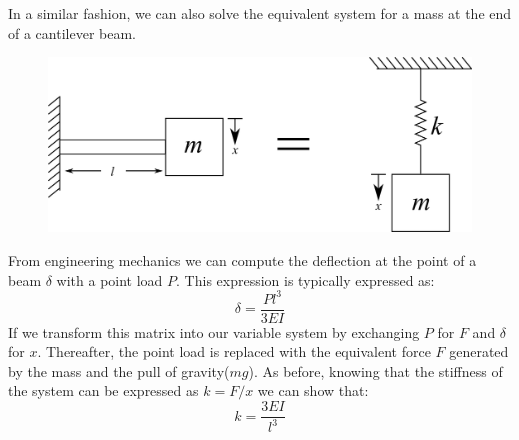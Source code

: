 \documentclass[12pt,letter]{article}
\numberwithin{ex}{section} %
\numberwithin{re}{section} %
\begin{document}
			In a similar fashion, we can also solve the equivalent system for a mass at the end of a cantilever beam.
			\begin{figure}[H]
				\centering
				\includegraphics[]{../figures/spring_and_bar_mass_cantilever_beam.png}
			\end{figure}			
			From engineering mechanics we can compute the deflection at the point of a beam $\delta$ with a point load $P$. This expression is typically expressed as:
			\begin{equation}
				\delta = \frac{Pl^3}{3EI}
			\end{equation}					
			If we transform this matrix into our variable system by exchanging $P$ for $F$ and $\delta$ for $x$. Thereafter, the point load is replaced with the equivalent force $F$ generated by the mass and the pull of gravity($mg$). As before, knowing that the stiffness of the system can be expressed as $k=F/x$ we can show that:
			\begin{equation}
				k = \frac{3EI}{l^3}
			\end{equation}	
\end{document}
